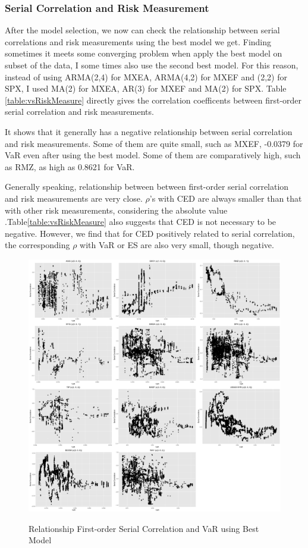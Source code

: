 \documentclass[12pt]{article}
\begin{document}
\subsubsection{Serial Correlation and Risk Measurement}
After the model selection, we now can check the relationship between serial correlations and risk measurements using the best model we get. Finding sometimes it meets some converging problem when apply the best model on subset of the data, I some times also use the second best model. For this reason, instead of  using ARMA(2,4) for MXEA, ARMA(4,2) for MXEF and (2,2) for SPX, I used MA(2) for MXEA,  AR(3) for MXEF and MA(2) for SPX. Table \ref{table:vsRiskMeasure} directly gives the correlation coefficents between first-order serial correlation and risk measurements.

It shows that it generally has a negative relationship between serial correlation and risk measurements. Some of them are quite small, such as MXEF, -0.0379 for VaR even after using the best model. Some of them are comparatively high, such as RMZ, as high as 0.8621 for VaR.

 Generally speaking,  relationship between between first-order serial correlation and risk measurements are very close. $\rho$'s with CED are always smaller than that with other risk measurements, considering the absolute value .Table\ref{table:vsRiskMeasure} also suggests that CED is not necessary to be negative. However, we find that for CED positively related to serial correlation, the corresponding $\rho$ with VaR or ES are also very small, though negative. 


\begin{figure}
  \caption{Relationship First-order Serial Correlation and VaR using Best Model}
  \includegraphics[width = \textwidth]{../figures/SerCol-VaR2yr}
  \label{fig:SerCol-VaR2yr}
\end{figure}
\end{document}
